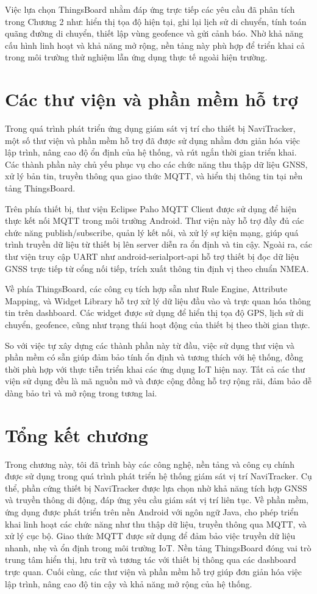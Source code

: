 \documentclass[../DoAn.tex]{subfiles}
\begin{document}
Việc lựa chọn ThingsBoard nhằm đáp ứng trực tiếp các yêu cầu đã phân tích trong Chương 2 như: hiển thị tọa độ hiện tại, ghi lại lịch sử di chuyển, tính toán quãng đường di chuyển, thiết lập vùng geofence và gửi cảnh báo. Nhờ khả năng cấu hình linh hoạt và khả năng mở rộng, nền tảng này phù hợp để triển khai cả trong môi trường thử nghiệm lẫn ứng dụng thực tế ngoài hiện trường.
\section{Các thư viện và phần mềm hỗ trợ}
\label{section:3.5}
Trong quá trình phát triển ứng dụng giám sát vị trí cho thiết bị NaviTracker, một số thư viện và phần mềm hỗ trợ đã được sử dụng nhằm đơn giản hóa việc lập trình, nâng cao độ ổn định của hệ thống, và rút ngắn thời gian triển khai. Các thành phần này chủ yếu phục vụ cho các chức năng thu thập dữ liệu GNSS, xử lý bản tin, truyền thông qua giao thức MQTT, và hiển thị thông tin tại nền tảng ThingsBoard.

Trên phía thiết bị, thư viện Eclipse Paho MQTT Client được sử dụng để hiện thực kết nối MQTT trong môi trường Android. Thư viện này hỗ trợ đầy đủ các chức năng publish/subscribe, quản lý kết nối, và xử lý sự kiện mạng, giúp quá trình truyền dữ liệu từ thiết bị lên server diễn ra ổn định và tin cậy. Ngoài ra, các thư viện truy cập UART như android-serialport-api hỗ trợ thiết bị đọc dữ liệu GNSS trực tiếp từ cổng nối tiếp, trích xuất thông tin định vị theo chuẩn NMEA.

Về phía ThingsBoard, các công cụ tích hợp sẵn như Rule Engine, Attribute Mapping, và Widget Library hỗ trợ xử lý dữ liệu đầu vào và trực quan hóa thông tin trên dashboard. Các widget được sử dụng để hiển thị tọa độ GPS, lịch sử di chuyển, geofence, cũng như trạng thái hoạt động của thiết bị theo thời gian thực.

So với việc tự xây dựng các thành phần này từ đầu, việc sử dụng thư viện và phần mềm có sẵn giúp đảm bảo tính ổn định và tương thích với hệ thống, đồng thời phù hợp với thực tiễn triển khai các ứng dụng IoT hiện nay. Tất cả các thư viện sử dụng đều là mã nguồn mở và được cộng đồng hỗ trợ rộng rãi, đảm bảo dễ dàng bảo trì và mở rộng trong tương lai.
\section{Tổng kết chương}
\label{section:3.6}
Trong chương này, tôi đã trình bày các công nghệ, nền tảng và công cụ chính được sử dụng trong quá trình phát triển hệ thống giám sát vị trí NaviTracker. Cụ thể, phần cứng thiết bị NaviTracker được lựa chọn nhờ khả năng tích hợp GNSS và truyền thông di động, đáp ứng yêu cầu giám sát vị trí liên tục. Về phần mềm, ứng dụng được phát triển trên nền Android với ngôn ngữ Java, cho phép triển khai linh hoạt các chức năng như thu thập dữ liệu, truyền thông qua MQTT, và xử lý cục bộ. Giao thức MQTT được sử dụng để đảm bảo việc truyền dữ liệu nhanh, nhẹ và ổn định trong môi trường IoT. Nền tảng ThingsBoard đóng vai trò trung tâm hiển thị, lưu trữ và tương tác với thiết bị thông qua các dashboard trực quan. Cuối cùng, các thư viện và phần mềm hỗ trợ giúp đơn giản hóa việc lập trình, nâng cao độ tin cậy và khả năng mở rộng của hệ thống.
\end{document}

